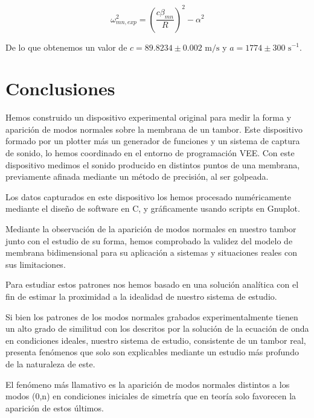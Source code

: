 \documentclass[journal, a4paper,onecolumn]{IEEEtran}
\begin{document}
\begin{equation}
    \omega_{mn, exp}^2= (\frac{c \beta _{mn}}{R})^2-\alpha^2
\end{equation}\newline

De lo que obtenemos un valor de $c = 89.8234\pm 0.002$ $\text{m/s}$ y $a= 1774 \pm 300$ $\text{s}^{-1}$.\newline

\section{Conclusiones}

Hemos construido un dispositivo experimental original para medir la forma y aparición de modos normales sobre la membrana de un tambor. Este dispositivo formado por un plotter más un generador de funciones y un sistema de captura de sonido, lo hemos coordinado en el entorno de programación VEE. Con este dispositivo medimos el sonido producido en distintos puntos de una membrana, previamente afinada mediante un método de precisión, al ser golpeada.\newline

Los datos capturados en este dispositivo los hemos procesado numéricamente mediante el diseño de software en C, y gráficamente usando scripts en Gnuplot.
\newline

Mediante la observación de la aparición de modos normales en nuestro tambor junto con el estudio de su forma, hemos comprobado la validez del modelo de membrana bidimensional para su aplicación a sistemas y situaciones reales con sus limitaciones. \newline

Para estudiar estos patrones nos hemos basado en una solución analítica con el fin de estimar la proximidad a la idealidad de nuestro sistema de estudio.\newline

Si bien los patrones de los modos normales grabados experimentalmente tienen un alto grado de similitud con los descritos por la solución de la ecuación de onda en condiciones ideales, nuestro sistema de estudio, consistente de un tambor real, presenta fenómenos que solo son explicables mediante un estudio más profundo de la naturaleza de este.\newline

El fenómeno  más llamativo es la aparición de modos normales distintos a los modos (0,n) en condiciones iniciales de simetría que en teoría solo favorecen la aparición de estos últimos.\newline
\end{document}
